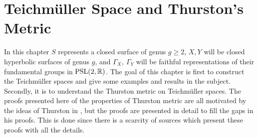 \chapter{Teichm\"{u}ller Space and Thurston's Metric}
In this chapter $S$ represents a closed surface of genus $g\geq 2$, $X,Y$ will be closed hyperbolic surfaces of genus $g$, and $\Gamma_X,\ \Gamma_Y$ will be faithful representations of their fundamental groups in $\text{PSL}(2,\mathbb{R})$. The goal of this chapter is first to construct the Teichm\"{u}ller spaces and give some examples and results in the subject. Secondly, it is to understand the Thurston metric on Teichm\"{u}ller spaces. The proofs presented here of the properties of Thurston metric are all motivated by the ideas of Thurston in \cite{thurston}, but the proofs are presented in detail to fill the gaps in his proofs. This is done since there is a scarcity of sources which present these proofs with all the details.
